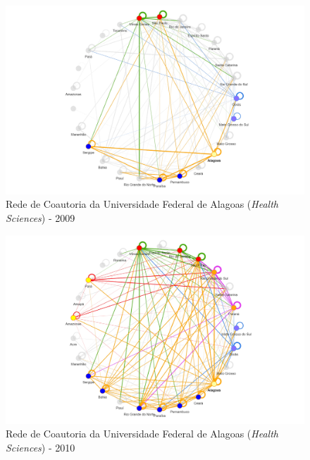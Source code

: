 \begin{figure}[H]
	\centering
	\includegraphics[width=\linewidth]{Imagens/rede-al-2009.pdf}
	\caption{Rede de Coautoria da Universidade Federal de Alagoas (\textit{Health Sciences}) - 2009}
	\label{Rede de Coautoria - UF AL 2009}
\end{figure}

\begin{figure}[H]
	\centering
	\includegraphics[width=\linewidth]{Imagens/rede-al-2010.pdf}
	\caption{Rede de Coautoria da Universidade Federal de Alagoas (\textit{Health Sciences}) - 2010}
	\label{Rede de Coautoria - UF AL 2010}
\end{figure}

